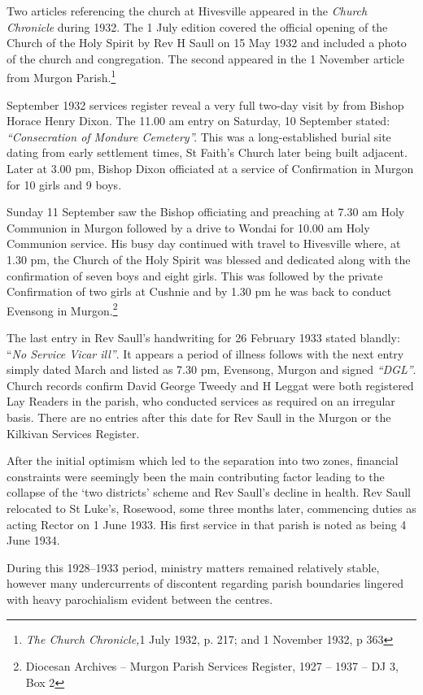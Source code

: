 Two articles referencing the church at Hivesville appeared in the \emph{Church Chronicle} during 1932. The 1 July edition covered the official opening of the Church of the Holy Spirit by Rev H Saull on 15 May 1932 and included a photo of the church and congregation. The second appeared in the 1 November article from Murgon Parish.\footnote{\emph{The Church Chronicle,}1 July 1932, p. 217; and 1 November 1932, p 363}

September 1932 services register reveal a very full two-day visit by from Bishop Horace Henry Dixon. The 11.00 am entry on Saturday, 10 September stated: \emph{``Consecration of Mondure Cemetery''.} This was a long-established burial site dating from early settlement times, St Faith's Church later being built adjacent. Later at 3.00 pm, Bishop Dixon officiated at a service of Confirmation in Murgon for 10 girls and 9 boys.

Sunday 11 September saw the Bishop officiating and preaching at 7.30 am Holy Communion in Murgon followed by a drive to Wondai for 10.00 am Holy Communion service. His busy day continued with travel to Hivesville where, at 1.30 pm, the Church of the Holy Spirit was blessed and dedicated along with the confirmation of seven boys and eight girls. This was followed by the private Confirmation of two girls at Cushnie and by 1.30 pm he was back to conduct Evensong in Murgon.\footnote{Diocesan Archives -- Murgon Parish Services Register, 1927 -- 1937 -- DJ 3, Box 2}

The last entry in Rev Saull's handwriting for 26 February 1933 stated blandly: ``\emph{No Service Vicar ill''}. It appears a period of illness follows with the next entry simply dated March and listed as 7.30 pm, Evensong, Murgon and signed \emph{``DGL''}. Church records confirm David George Tweedy and H Leggat were both registered Lay Readers in the parish, who conducted services as required on an irregular basis. There are no entries after this date for Rev Saull in the Murgon or the Kilkivan Services Register.

After the initial optimism which led to the separation into two zones, financial constraints were seemingly been the main contributing factor leading to the collapse of the `two districts' scheme and Rev Saull's decline in health. Rev Saull relocated to St Luke's, Rosewood, some three months later, commencing duties as acting Rector on 1 June 1933. His first service in that parish is noted as being 4 June 1934.

During this 1928--1933 period, ministry matters remained relatively stable, however many undercurrents of discontent regarding parish boundaries lingered with heavy parochialism evident between the centres.

